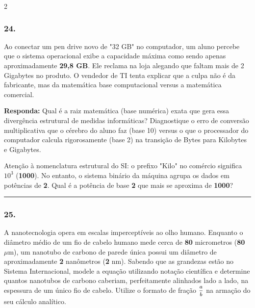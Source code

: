\documentclass[twoside, 10pt, a4paper]{article}
\newlength{\espacoPreQuestao}\setlength{\espacoPreQuestao}{0.1cm}
\newlength{\espacoQuestao}\setlength{\espacoQuestao}{0.2cm}
\begin{document}
\begin{multicols*}{2}
\subsubsection*{24.} Ao conectar um pen drive novo de "32 GB" no computador, um aluno percebe que o sistema operacional exibe a capacidade máxima como sendo apenas aproximadamente \textbf{29,8 GB}. Ele reclama na loja alegando que faltam mais de 2 Gigabytes no produto. O vendedor de TI tenta explicar que a culpa não é da fabricante, mas da matemática base computacional versus a matemática comercial.
\begin{boxresponda}
\textbf{Responda:} Qual é a raiz matemática (base numérica) exata que gera essa divergência estrutural de medidas informáticas? Diagnostique o erro de conversão multiplicativa que o cérebro do aluno faz (base 10) versus o que o processador do computador calcula rigorosamente (base 2) na transição de Bytes para Kilobytes e Gigabytes.
\end{boxresponda}
\begin{boxdica}
Atenção à nomenclatura estrutural do SI: o prefixo "Kilo" no comércio significa $10^3$ (\textbf{1000}). No entanto, o sistema binário da máquina agrupa os dados em potências de \textbf{2}. Qual é a potência de base \textbf{2} que mais se aproxima de \textbf{1000}?
\end{boxdica}
\par\vspace{\espacoQuestao}

\noindent\textcolor{CorLinha}{\rule{\linewidth}{0.5pt}} 
\par\vspace{\espacoPreQuestao}
\subsubsection*{25.} A nanotecnologia opera em escalas imperceptíveis ao olho humano. Enquanto o diâmetro médio de um fio de cabelo humano mede cerca de \textbf{80} micrometros (\textbf{80} $\mu$m), um nanotubo de carbono de parede única possui um diâmetro de aproximadamente \textbf{2} nanômetros (\textbf{2} nm). Sabendo que as grandezas estão no Sistema Internacional, modele a equação utilizando notação científica e determine quantos nanotubos de carbono caberiam, perfeitamente alinhados lado a lado, na espessura de um único fio de cabelo. Utilize o formato de fração $ \mfrac{a}{b} $ na armação do seu cálculo analítico.
\par\vspace{\espacoQuestao}


\end{multicols*}
\end{document}
